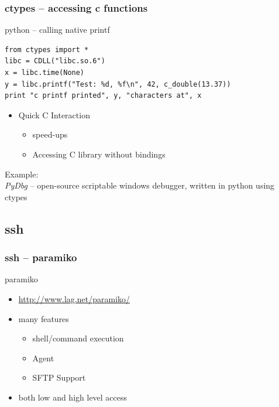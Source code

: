 \documentclass{beamer}
\begin{document}
\begin{frame}[fragile]
	\frametitle{ctypes -- accessing c functions}
	\begin{exampleblock}{python -- calling native printf}
	\begin{lstlisting}
from ctypes import *
libc = CDLL("libc.so.6")
x = libc.time(None)
y = libc.printf("Test: %d, %f\n", 42, c_double(13.37))
print "c printf printed", y, "characters at", x
	\end{lstlisting}
	\end{exampleblock}
\pause
	\begin{itemize}
		\item Quick C Interaction
		\begin{itemize}
			\item speed-ups
			\item Accessing C library without bindings
		\end{itemize}
	\end{itemize}
	Example:\\
	\emph{PyDbg} -- open-source scriptable windows debugger, written in python using ctypes
\end{frame}

\subsection*{ssh}
\begin{frame}
	\frametitle{ssh -- paramiko}
	\begin{block}{paramiko}
	\begin{itemize}
		\item \url{http://www.lag.net/paramiko/}
		\item many features
		\begin{itemize}
			\item shell/command execution
			\item Agent
			\item SFTP Support
		\end{itemize}
		\item both low and high level access
	\end{itemize}
	\end{block}
\end{frame}
\end{document}
